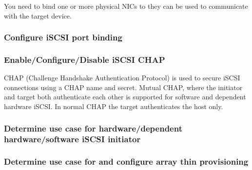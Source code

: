 You need to bind one or more physical NICs to they can be used to communicate
with the target device.\\

\subsubsection{Configure iSCSI port binding}

\subsubsection{Enable/Configure/Disable iSCSI CHAP}

CHAP (Challenge Handshake Authentication Protocol) is used to secure iSCSI
connections using a CHAP name and secret. Mutual CHAP, where the initiator and
target both authenticate each other is supported for software and dependent
hardware iSCSI. In normal CHAP the target authenticates the host only.

\subsubsection{Determine use case for hardware/dependent hardware/software iSCSI initiator}

\subsubsection{Determine use case for and configure array thin provisioning}
